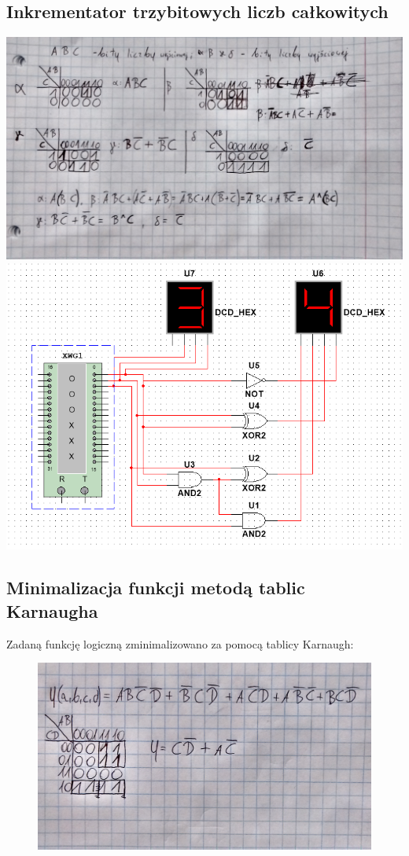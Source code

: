\documentclass[12pt,a4paper]{article}
\begin{document}
\subsection{Inkrementator trzybitowych liczb całkowitych}
\includegraphics[width=\textwidth]{7_bit_incr_karnaugh}
\includegraphics[width=\textwidth]{2aBetter}


\subsection{Minimalizacja funkcji metodą tablic Karnaugha}
Zadaną funkcję logiczną zminimalizowano za pomocą tablicy Karnaugh:

\begin{figure}[H]
\centering
\includegraphics[width=\textwidth]{min_func_karnaugh}
\end{figure}
\end{document}
